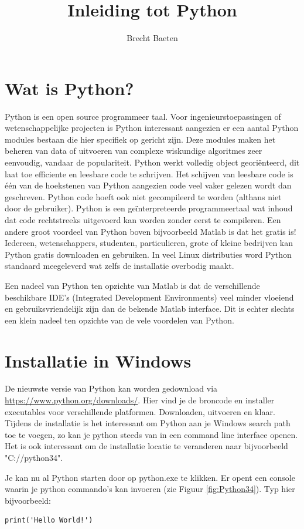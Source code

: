 \documentclass[11pt,twoside]{article}
\title{Inleiding tot Python}
\author{Brecht Baeten}
\begin{document}
	\maketitle

	\section{Wat is Python?}
Python is een open source programmeer taal. Voor ingenieurstoepassingen of wetenschappelijke projecten is Python interessant aangezien er een aantal Python modules bestaan die hier specifiek op gericht zijn. Deze modules maken het beheren van data of uitvoeren van complexe wiskundige algoritmes zeer eenvoudig, vandaar de populariteit. Python werkt volledig object georiënteerd, dit laat toe efficiente en leesbare code te schrijven. Het schijven van leesbare code is één van de hoekstenen van Python aangezien code veel vaker gelezen wordt dan geschreven. Python code hoeft ook niet gecompileerd te worden (althans niet door de gebruiker). Python is een geïnterpreteerde programmeertaal wat inhoud dat code rechtstreeks uitgevoerd kan worden zonder eerst te compileren. Een andere groot voordeel van Python boven bijvoorbeeld Matlab is dat het gratis is! Iedereen, wetenschappers, studenten, particulieren, grote of kleine bedrijven kan Python gratis downloaden en gebruiken. In veel Linux distributies word Python standaard meegeleverd wat zelfs de installatie overbodig maakt.

Een nadeel van Python ten opzichte van Matlab is dat de verschillende beschikbare IDE's (Integrated Development Environments) veel minder vloeiend en gebruiksvriendelijk zijn dan de bekende Matlab interface. Dit is echter slechts een klein nadeel ten opzichte van de vele voordelen van Python.

	\section{Installatie in Windows}
De nieuwste versie van Python kan worden gedownload via \url{https://www.python.org/downloads/}. Hier vind je de broncode en installer executables voor verschillende platformen. Downloaden, uitvoeren en klaar. Tijdens de installatie is het interessant om Python aan je Windows search path toe te voegen, zo kan je python steeds van in een command line interface openen. Het is ook interessant om de installatie locatie te veranderen naar bijvoorbeeld  "\textsf{C://python34}".

Je kan nu al Python starten door op python.exe te klikken. Er opent een console waarin je python commando's kan invoeren (zie Figuur \ref{fig:Python34}). Typ hier bijvoorbeeld:
\begin{lstlisting}
print('Hello World!')
\end{lstlisting}
\end{document}
